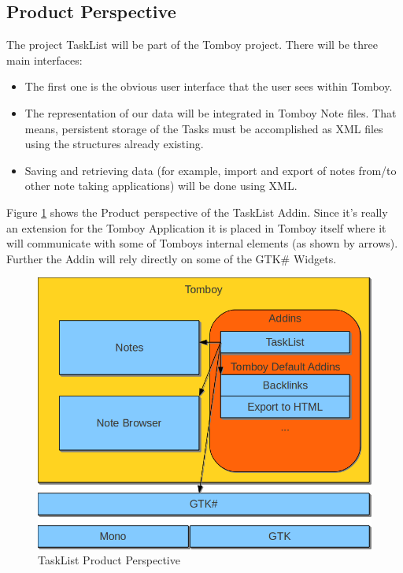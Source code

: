 \subsection{Product Perspective}
\label{description:perspective}
  The project TaskList will be part of the Tomboy project. There will be three main interfaces:

  \begin{itemize}
    \item The first one is the obvious user interface that the user sees within Tomboy.
    \item The representation of our data will be integrated in Tomboy Note files. That means, persistent storage of the Tasks must be accomplished as XML files using the structures already existing.
    \item Saving and retrieving data (for example, import and export of notes from/to other note taking applications) will be done using XML.
  \end{itemize}

  Figure \ref{perspective} shows the Product perspective of the TaskList Addin. Since it's really an extension for the Tomboy Application it is placed in Tomboy itself where it will communicate with some of Tomboys internal elements (as shown by arrows). Further the Addin will rely directly on some of the GTK\# Widgets.
  \begin{figure}[h]
    \includegraphics[width=\textwidth]{graphics/product_perspective_diagram.png}
    \caption{TaskList Product Perspective}
    \label{perspective}
  \end{figure}


